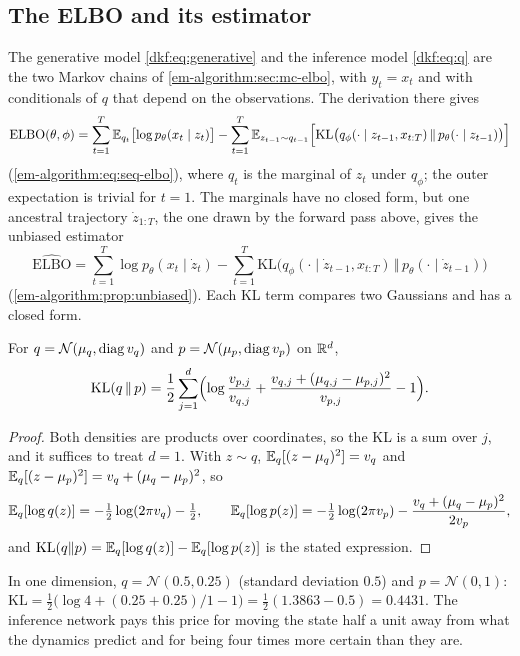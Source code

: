 \begin{notechapter}
\section{The ELBO and its estimator}\label{dkf:sec:elbo}

The generative model \eqref{dkf:eq:generative} and the inference model \eqref{dkf:eq:q} are the two Markov
chains of \cref{em-algorithm:sec:mc-elbo}, with $y_t = x_t$ and with conditionals of $q$ that depend on the
observations. The derivation there gives
\[
  \mathrm{ELBO}(\theta, \phi) = \sum_{t=1}^T\mathbb{E}_{q_t}\bigl[\log p_\theta(x_t\mid z_t)\bigr]
  - \sum_{t=1}^T\mathbb{E}_{z_{t-1}\sim q_{t-1}}\Bigl[\mathrm{KL}\bigl(q_\phi(\cdot\mid z_{t-1}, x_{t:T})\,\Vert\,p_\theta(\cdot\mid z_{t-1})\bigr)\Bigr]
\]
(\cref{em-algorithm:eq:seq-elbo}), where $q_t$ is the marginal of $z_t$ under $q_\phi$; the outer expectation is trivial
for $t = 1$. The marginals have no closed form, but one ancestral trajectory $\dot z_{1:T}$, the one drawn
by the forward pass above, gives the unbiased estimator
\[
  \widehat{\mathrm{ELBO}} = \sum_{t=1}^T\log p_\theta(x_t\mid\dot z_t)
  - \sum_{t=1}^T\mathrm{KL}\bigl(q_\phi(\cdot\mid\dot z_{t-1}, x_{t:T})\,\Vert\,p_\theta(\cdot\mid\dot z_{t-1})\bigr)
\]
(\cref{em-algorithm:prop:unbiased}). Each KL term compares two Gaussians and has a closed form.

\begin{proposition}\label{dkf:prop:kl}
For $q = \mathcal N(\mu_q, \operatorname{diag} v_q)$ and $p = \mathcal N(\mu_p, \operatorname{diag} v_p)$ on $\mathbb{R}^d$,
\[
  \mathrm{KL}(q\,\Vert\,p) = \frac12\sum_{j=1}^d\Bigl(\log\frac{v_{p,j}}{v_{q,j}} + \frac{v_{q,j} + (\mu_{q,j} - \mu_{p,j})^2}{v_{p,j}} - 1\Bigr).
\]
\end{proposition}

\begin{proof}
Both densities are products over coordinates, so the KL is a sum over $j$, and it suffices to
treat $d = 1$. With $z\sim q$, $\mathbb{E}_q[(z - \mu_q)^2] = v_q$ and $\mathbb{E}_q[(z - \mu_p)^2] = v_q + (\mu_q - \mu_p)^2$, so
\[
  \mathbb{E}_q[\log q(z)] = -\tfrac12\log(2\pi v_q) - \tfrac12,\qquad
  \mathbb{E}_q[\log p(z)] = -\tfrac12\log(2\pi v_p) - \frac{v_q + (\mu_q - \mu_p)^2}{2v_p},
\]
and $\mathrm{KL}(q\Vert p) = \mathbb{E}_q[\log q(z)] - \mathbb{E}_q[\log p(z)]$ is the stated expression.
\end{proof}

\begin{example}\label{dkf:ex:kl}
In one dimension, $q = \mathcal N(0.5, 0.25)$ (standard deviation $0.5$) and $p = \mathcal N(0, 1)$:
$\mathrm{KL} = \frac12\bigl(\log4 + (0.25 + 0.25)/1 - 1\bigr) = \frac12(1.3863 - 0.5) = 0.4431$. The inference network pays this price for
moving the state half a unit away from what the dynamics predict and for being four times
more certain than they are.
\end{example}


\end{notechapter}
